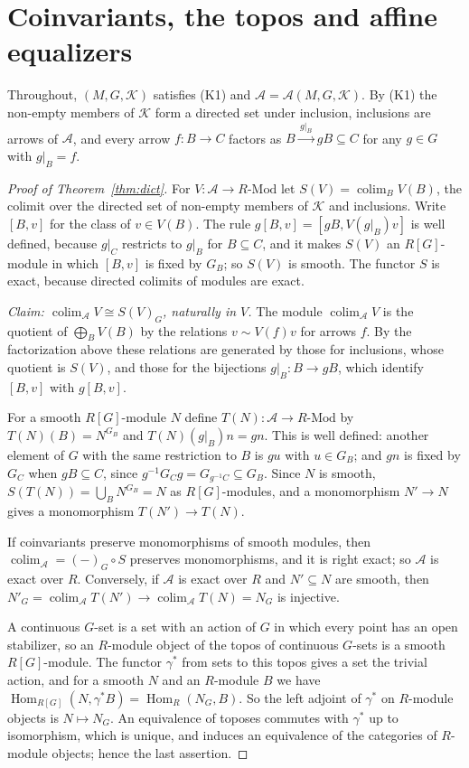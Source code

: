\documentclass[11pt,a4paper]{article}
\theoremstyle{definition}
\newcommand{\A}{\mathcal{A}}
\newcommand{\K}{\mathcal{K}}
\newcommand{\colim}{\operatorname{colim}}
\newcommand{\Hom}{\operatorname{Hom}}
\begin{document}
\section{Coinvariants, the topos and affine equalizers}\label{sec:dict}

Throughout, $(M,G,\K)$ satisfies (K1) and $\A=\A(M,G,\K)$. By (K1) the
non-empty members of $\K$ form a directed set under inclusion, inclusions
are arrows of $\A$, and every arrow $f\colon B\to C$ factors as
$B\xrightarrow{\,g|_B\,}gB\subseteq C$ for any $g\in G$ with $g|_B=f$.

\begin{proof}[Proof of Theorem~\ref{thm:dict}]
For $V\colon\A\to R\text{-Mod}$ let $S(V)=\colim_{B}V(B)$, the colimit over
the directed set of non-empty members of $\K$ and inclusions. Write $[B,v]$
for the class of $v\in V(B)$. The rule $g[B,v]=[gB,V(g|_B)v]$ is well defined,
because $g|_C$ restricts to $g|_B$ for $B\subseteq C$, and it makes $S(V)$ an
$R[G]$-module in which $[B,v]$ is fixed by $G_B$; so $S(V)$ is smooth. The
functor $S$ is exact, because directed colimits of modules are exact.

\emph{Claim: $\colim_{\A}V\cong S(V)_G$, naturally in $V$.} The module
$\colim_{\A}V$ is the quotient of $\bigoplus_BV(B)$ by the relations
$v\sim V(f)v$ for arrows $f$. By the factorization above these relations are
generated by those for inclusions, whose quotient is $S(V)$, and those for
the bijections $g|_B\colon B\to gB$, which identify $[B,v]$ with $g[B,v]$.

For a smooth $R[G]$-module $N$ define $T(N)\colon\A\to R\text{-Mod}$ by
$T(N)(B)=N^{G_B}$ and $T(N)(g|_B)n=gn$. This is well defined: another
element of $G$ with the same restriction to $B$ is $gu$ with $u\in G_B$; and
$gn$ is fixed by $G_C$ when $gB\subseteq C$, since
$g^{-1}G_Cg=G_{g^{-1}C}\subseteq G_B$. Since $N$ is smooth,
$S(T(N))=\bigcup_BN^{G_B}=N$ as $R[G]$-modules, and a monomorphism
$N'\to N$ gives a monomorphism $T(N')\to T(N)$.

If coinvariants preserve monomorphisms of smooth modules, then
$\colim_{\A}=(-)_G\circ S$ preserves monomorphisms, and it is right exact;
so $\A$ is exact over $R$. Conversely, if $\A$ is exact over $R$ and
$N'\subseteq N$ are smooth, then
$N'_G=\colim_{\A}T(N')\to\colim_{\A}T(N)=N_G$ is injective.

A continuous $G$-set is a set with an action of $G$ in which every point
has an open stabilizer, so an $R$-module object of the topos of continuous
$G$-sets is a smooth $R[G]$-module. The functor $\gamma^*$ from sets to this
topos gives a set the trivial action, and for a smooth $N$ and an
$R$-module $B$ we have $\Hom_{R[G]}(N,\gamma^*B)=\Hom_R(N_G,B)$. So the left
adjoint of $\gamma^*$ on $R$-module objects is $N\mapsto N_G$. An equivalence
of toposes commutes with $\gamma^*$ up to isomorphism, which is unique, and
induces an equivalence of the categories of $R$-module objects; hence the
last assertion.
\end{proof}
\end{document}
